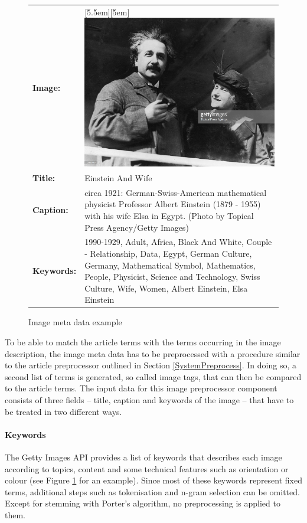 \documentclass[11pt,a4paper,twoside]{article}
\begin{document}
\begin{figure}[t]
    \caption{Image meta data example}
    \centering
    \def\arraystretch{1.3}
    \begin{tabular}{l p{10cm}}
        \textbf{Image:} & \raisebox{-4.3em}[5.5em][5em]{\includegraphics[width=.3\columnwidth]{einstein.jpg}} \\
        \textbf{Title:} & Einstein And Wife \\
        \textbf{Caption:} & circa 1921:  German-Swiss-American mathematical physicist Professor Albert Einstein (1879 - 1955) with his wife Elsa in Egypt.  (Photo by Topical Press Agency/Getty Images) \\
        \textbf{Keywords:} & \nohyphens{1990-1929, Adult, Africa, Black And White, Couple - Relationship, Data, Egypt, German Culture, Germany, Mathematical Symbol, Mathematics, People, Physicist, Science and Technology, Swiss Culture, Wife, Women, Albert Einstein, Elsa Einstein} \\
    \end{tabular}
    \label{fig:image-meta-example}
\end{figure}

\noindent To be able to match the article terms with the terms occurring in the image description, the image meta data has to be preprocessed with a procedure similar to the article preprocessor outlined in Section \ref{SystemPreprocess}. In doing so, a second list of terms is generated, so called image tags, that can then be compared to the article terms. The input data for this image preprocessor component consists of three fields -- title, caption and keywords of the image -- that have to be treated in two different ways.

\paragraph{Keywords} The Getty Images API provides a list of keywords that describes each image according to topics, content and some technical features such as orientation or colour (see Figure \ref{fig:image-meta-example} for an example). Since most of these keywords represent fixed terms, additional steps such as tokenisation and n-gram selection can be omitted. Except for stemming with Porter's algorithm, no preprocessing is applied to them.
\end{document}
